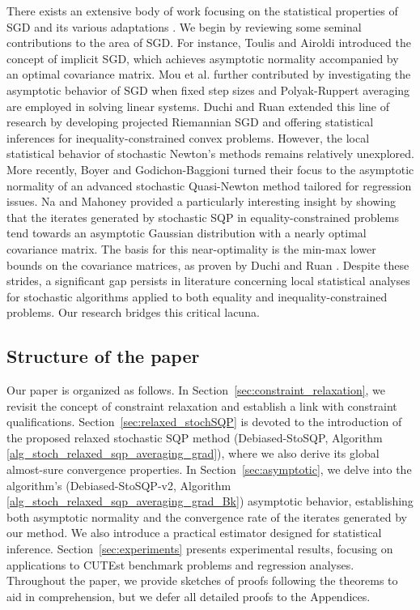 \documentclass[aos]{imsart}
\numberwithin{equation}{section}
\theoremstyle{plain}
\begin{document}
There exists an extensive body of work focusing on the statistical properties of SGD and its various adaptations \cite{polyak1992acceleration, chen2020statistical}. 
We begin by reviewing some seminal contributions to the area of SGD. 
For instance, Toulis and Airoldi \cite{toulis2017asymptotic} introduced the concept of implicit SGD, which achieves asymptotic normality accompanied by an optimal covariance matrix. Mou et al. \cite{mou2020linear} further contributed by investigating the asymptotic behavior of SGD when fixed step sizes and Polyak-Ruppert averaging are employed in solving linear systems.
Duchi and Ruan \cite{duchi2021asymptotic} extended this line of research by developing projected Riemannian SGD and offering statistical inferences for inequality-constrained convex problems. However, the local statistical behavior of stochastic Newton's methods remains relatively unexplored.
More recently, Boyer and Godichon-Baggioni \cite{boyer2023asymptotic} turned their focus to the asymptotic normality of an advanced stochastic Quasi-Newton method tailored for regression issues.
Na and Mahoney \cite{na2022asymptotic} provided a particularly interesting insight by showing that the iterates generated by stochastic SQP in equality-constrained problems tend towards an asymptotic Gaussian distribution with a nearly optimal covariance matrix.
The basis for this near-optimality is the min-max lower bounds on the covariance matrices, as proven by Duchi and Ruan \cite{duchi2021asymptotic}. 
Despite these strides, a significant gap persists in literature concerning local statistical analyses for stochastic algorithms applied to both equality and inequality-constrained problems. 
Our research bridges this critical lacuna.


\subsection{Structure of the paper}

Our paper is organized as follows. 
In Section~\ref{sec:constraint_relaxation}, we revisit the concept of constraint relaxation and establish a link with constraint qualifications. 
Section~\ref{sec:relaxed_stochSQP} is devoted to the introduction of the proposed relaxed stochastic SQP method (Debiased-StoSQP, Algorithm \ref{alg_stoch_relaxed_sqp_averaging_grad}), 
where we also derive its global almost-sure convergence properties. 
In Section~\ref{sec:asymptotic}, we delve into the algorithm's (Debiased-StoSQP-v2, Algorithm \ref{alg_stoch_relaxed_sqp_averaging_grad_Bk}) asymptotic behavior, establishing both asymptotic normality and the convergence rate of the iterates generated by our method. 
We also introduce a practical estimator designed for statistical inference. 
Section~\ref{sec:experiments} presents experimental results, focusing on applications to CUTEst benchmark problems and regression analyses. 
Throughout the paper, we provide sketches of proofs following the theorems to aid in comprehension, but we defer all detailed proofs to the Appendices.
\end{document}
